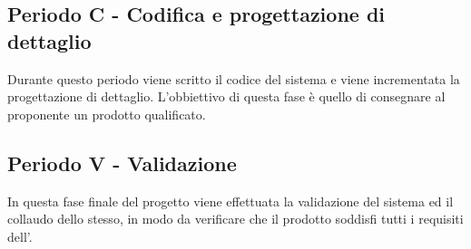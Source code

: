 \documentclass[./PianoDiProgetto.tex]{subfiles}
\begin{document}
  \subsection{Periodo C - Codifica e progettazione di dettaglio}

  Durante questo periodo viene scritto il codice del sistema e viene incrementata la progettazione di dettaglio. L'obbiettivo di questa fase è quello di consegnare al proponente un prodotto qualificato.

  \subsection{Periodo V - Validazione}

  In questa fase finale del progetto viene effettuata la validazione del sistema ed il
  collaudo dello stesso, in modo da verificare che il prodotto soddisfi tutti i requisiti
  dell'\ARdoc. 
\end{document}
